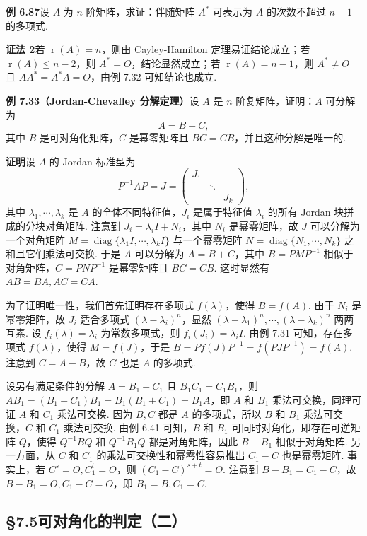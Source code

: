 \documentclass[UTF8, 12pt, fontset=fandol, oneside]{ctexart}
\begin{document}
\noindent\textbf{例 6.87}\quad 设 $A$ 为 $n$ 阶矩阵，求证：伴随矩阵 $A^*$ 可表示为 $A$ 的次数不超过 $n-1$ 的多项式.

\noindent\textbf{证法 2}\quad 若 $\operatorname{r}(A)=n$，则由 Cayley-Hamilton 定理易证结论成立；若 $\operatorname{r}(A)\le n-2$，则 $A^*=O$，结论显然成立；若 $\operatorname{r}(A)=n-1$，则 $A^*\ne O$ 且 $AA^*=A^*A=O$，由例 7.32 可知结论也成立.

\noindent\textbf{例 7.33（Jordan-Chevalley 分解定理）}\quad 设 $A$ 是 $n$ 阶复矩阵，证明：$A$ 可分解为
\[
A=B+C,
\]
其中 $B$ 是可对角化矩阵，$C$ 是幂零矩阵且 $BC=CB$，并且这种分解是唯一的.

\noindent\textbf{证明}\quad 设 $A$ 的 Jordan 标准型为
\[
P^{-1}AP=J=
\left(\begin{array}{ccc}
J_1 &        &  \\
    & \ddots &  \\
    &        & J_k
\end{array}\right),
\]
其中 $\lambda_1,\cdots,\lambda_k$ 是 $A$ 的全体不同特征值，$J_i$ 是属于特征值 $\lambda_i$ 的所有 Jordan 块拼成的分块对角矩阵. 注意到 $J_i=\lambda_iI+N_i$，其中 $N_i$ 是幂零矩阵，故 $J$ 可以分解为一个对角矩阵 $M=\operatorname{diag}\{\lambda_1I,\cdots,\lambda_kI\}$ 与一个幂零矩阵 $N=\operatorname{diag}\{N_1,\cdots,N_k\}$ 之和且它们乘法可交换. 于是 $A$ 可以分解为 $A=B+C$，其中 $B=PMP^{-1}$ 相似于对角矩阵，$C=PNP^{-1}$ 是幂零矩阵且 $BC=CB$. 这时显然有 $AB=BA,AC=CA$.

为了证明唯一性，我们首先证明存在多项式 $f(\lambda)$，使得 $B=f(A)$. 由于 $N_i$ 是幂零矩阵，故 $J_i$ 适合多项式 $(\lambda-\lambda_i)^n$，显然 $(\lambda-\lambda_1)^n,\cdots,(\lambda-\lambda_k)^n$ 两两互素. 设 $f_i(\lambda)=\lambda_i$ 为常数多项式，则 $f_i(J_i)=\lambda_iI$. 由例 7.31 可知，存在多项式 $f(\lambda)$，使得 $M=f(J)$，于是 $B=Pf(J)P^{-1}=f(PJP^{-1})=f(A)$. 注意到 $C=A-B$，故 $C$ 也是 $A$ 的多项式.

设另有满足条件的分解 $A=B_1+C_1$ 且 $B_1C_1=C_1B_1$，则 $AB_1=(B_1+C_1)B_1=B_1(B_1+C_1)=B_1A$，即 $A$ 和 $B_1$ 乘法可交换，同理可证 $A$ 和 $C_1$ 乘法可交换. 因为 $B,C$ 都是 $A$ 的多项式，所以 $B$ 和 $B_1$ 乘法可交换，$C$ 和 $C_1$ 乘法可交换. 由例 6.41 可知，$B$ 和 $B_1$ 可同时对角化，即存在可逆矩阵 $Q$，使得 $Q^{-1}BQ$ 和 $Q^{-1}B_1Q$ 都是对角矩阵，因此 $B-B_1$ 相似于对角矩阵. 另一方面，从 $C$ 和 $C_1$ 的乘法可交换性和幂零性容易推出 $C_1-C$ 也是幂零矩阵. 事实上，若 $C^s=O,C_1^t=O$，则 $(C_1-C)^{s+t}=O$. 注意到 $B-B_1=C_1-C$，故 $B-B_1=O,C_1-C=O$，即 $B_1=B,C_1=C$.

\subsection*{§7.5\quad 可对角化的判定（二）}
\end{document}
